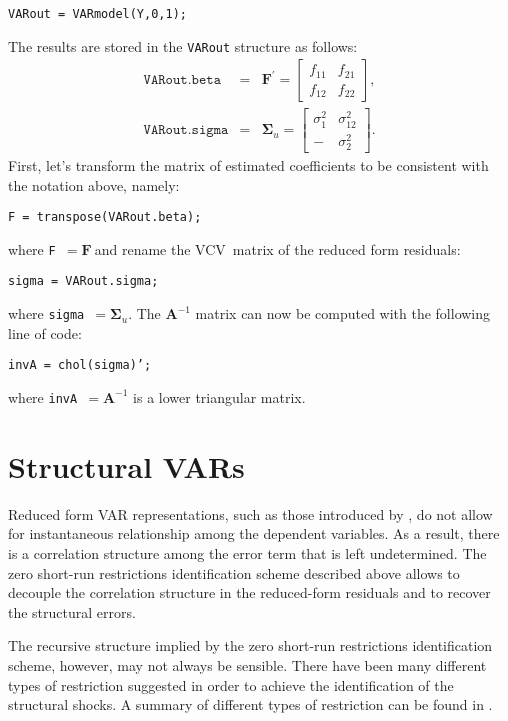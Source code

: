 \documentclass[11pt,a4paper]{report}
\numberwithin{equation}{chapter}
\numberwithin{section}{chapter}
\begin{document}
\texttt{VARout = VARmodel(Y,0,1);}\medskip

\noindent The results are stored in the \texttt{VARout} structure as follows:%
\begin{eqnarray*}
\mathtt{VARout.beta} &=&\mathbf{F}^{\prime }=\left[ 
\begin{array}{cc}
f_{11} & f_{21} \\ 
f_{12} & f_{22}%
\end{array}%
\right] , \\
\mathtt{VARout.sigma} &=&\mathbf{\Sigma }_{u}=%
\begin{bmatrix}
\sigma _{1}^{2} & \sigma _{12}^{2} \\ 
- & \sigma _{2}^{2}%
\end{bmatrix}%
.
\end{eqnarray*}%
First, let's transform the matrix of estimated coefficients to be consistent
with the notation above, namely:\medskip

\texttt{F = transpose(VARout.beta);}\medskip

\noindent where \texttt{F }$\mathbf{=F\ }$and rename the VCV\ matrix of the
reduced form residuals:\medskip

\texttt{sigma = VARout.sigma;}\medskip

\noindent where \texttt{sigma }$=\mathbf{\Sigma }_{u}$. The $\mathbf{A}^{-1}$
matrix can now be computed with the following line of code:\medskip

\texttt{invA = chol(sigma)';}\medskip

\noindent where \texttt{invA }$=\mathbf{A}^{-1}$ is a lower triangular
matrix.

\section{Structural VARs}

Reduced form VAR representations, such as those introduced by \cite{Sims1980}%
, do not allow for instantaneous relationship among the dependent variables.
As a result, there is a correlation structure among the error term that is
left undetermined. The zero short-run restrictions identification scheme
described above allows to decouple the correlation structure in the
reduced-form residuals and to recover the structural errors.

The recursive structure implied by the zero short-run restrictions
identification scheme, however, may not always be sensible. There have been
many different types of restriction suggested in order to achieve the
identification of the structural shocks. A summary of different types of
restriction can be found in \cite{ChristianoEichenbaumEvans1999}.
\end{document}
